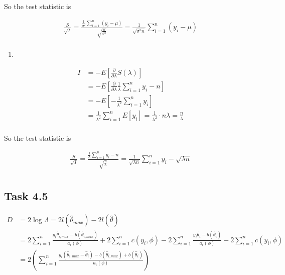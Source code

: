 \documentclass[
]{article}
\providecommand{\tightlist}{%
  \setlength{\itemsep}{0pt}\setlength{\parskip}{0pt}}
\begin{document}
So the test statistic is

\begin{equation}
\begin{split}
\frac{S}{\sqrt{I}} = \frac{\frac{1}{\sigma^2} \sum_{i=1}^n (y_i - \mu)}{\sqrt{\frac{n}{\sigma^2}}} = \frac{1}{\sqrt{\sigma^2 n}} \sum_{i=1}^n (y_i - \mu)\\
\end{split}
\end{equation}

\begin{enumerate}
\def\labelenumi{\alph{enumi})}
\setcounter{enumi}{1}
\tightlist
\item
\end{enumerate}

\begin{equation}
\begin{split}
I &= -E\left[ \frac{\partial}{\partial \lambda} S(\lambda)\right]\\
&= -E\left[ \frac{\partial}{\partial \lambda} \frac{1}{\lambda} \sum_{i=1}^n y_i - n\right]\\
&= -E\left[-\frac{1}{\lambda^2} \sum_{i=1}^n y_i\right]\\
&= \frac{1}{\lambda^2} \sum_{i=1}^n E[y_i] = \frac{1}{\lambda^2} \cdot n\lambda = \frac{n}{\lambda}\\
\end{split}
\end{equation}

So the test statistic is

\begin{equation}
\begin{split}
\frac{S}{\sqrt{I}} = \frac{\frac{1}{\lambda} \sum_{i=1}^n y_i - n}{\sqrt{\frac{n}{\lambda}}} = \frac{1}{\sqrt{\lambda n}} \sum_{i=1}^n y_i - \sqrt{\lambda n}\\
\end{split}
\end{equation}

\hypertarget{task-4.5}{%
\subsection{Task 4.5}\label{task-4.5}}

\begin{equation}
\begin{split}
D &= 2\log \Lambda = 2l(\hat\theta_{max}) - 2l(\hat\theta)\\
&= 2\sum_{i=1}^n \frac{y_i \hat\theta_{i,max} - b(\hat\theta_{i,max})}{a_i(\phi)} + 2\sum_{i=1}^n c(y_i, \phi) - 2\sum_{i=1}^n \frac{y_i \hat\theta_{i} - b(\hat\theta_{i})}{a_i(\phi)} - 2\sum_{i=1}^n c(y_i, \phi)\\
&= 2\left( \sum_{i=1}^n \frac{y_i (\hat\theta_{i,max} - \hat\theta_{i}) - b(\hat\theta_{i,max}) + b(\hat\theta_{i})}{a_i(\phi)}  \right)\\
\end{split}
\end{equation}
\end{document}
